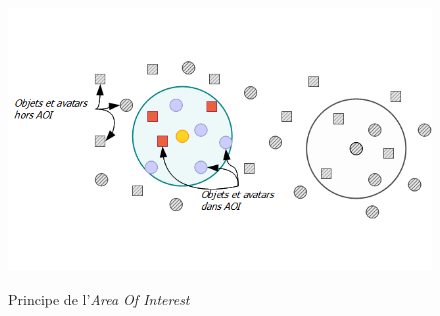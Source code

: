 	\vspace{5mm}
        \begin{figure}[!h]
        \centering
        \includegraphics[scale=0.65]{./Ressources/Images/AOI.png}\\
        \caption{Principe de l'\textit{Area Of Interest}}
        \label{AOI}
        \end{figure}
	\vspace{5mm}
